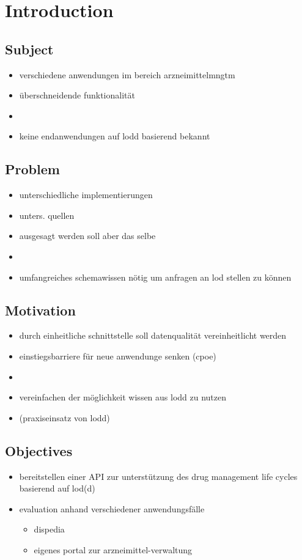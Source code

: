 \chapter{Introduction}
\label{cha:introduction-1}

\section{Subject}
\label{sec-1}

\begin{itemize}
\item verschiedene anwendungen im  bereich arzneimittelmngtm
\item überschneidende funktionalität
\item 
\item keine endanwendungen auf lodd basierend bekannt
\end{itemize}
\section{Problem}
\label{sec-2}

\begin{itemize}
\item unterschiedliche implementierungen
\item unters. quellen
\item ausgesagt werden soll aber das selbe
\item 
\item umfangreiches schemawissen nötig um anfragen an lod stellen zu können
\end{itemize}
\section{Motivation}
\label{sec-3}

\begin{itemize}
\item durch einheitliche schnittstelle soll datenqualität vereinheitlicht werden
\item einstiegsbarriere für neue anwendunge senken (cpoe)
\item 
\item vereinfachen der möglichkeit wissen aus lodd zu nutzen
\item (praxiseinsatz von lodd)
\end{itemize}
\section{Objectives}
\label{sec-4}

\begin{itemize}
\item bereitstellen einer API zur unterstützung des drug management life cycles basierend auf lod(d)
\item evaluation anhand verschiedener anwendungsfälle
\begin{itemize}
\item dispedia
\item eigenes portal zur arzneimittel-verwaltung
\end{itemize}
\end{itemize}

